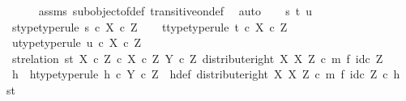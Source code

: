 \begin{isabellebody}
\ \ \ \ \isamarkupfalse%
\ assms\ subobject{\isacharunderscore}{\kern0pt}of{\isacharunderscore}{\kern0pt}def{}\ transitive{\isacharunderscore}{\kern0pt}on{\isacharunderscore}{\kern0pt}def\ \isamarkupfalse%
\ auto\isanewline
\isanewline
\ \ \isamarkupfalse%
\ s\ t\ u\isanewline
\ \ \isamarkupfalse%
\ s{\isacharunderscore}{\kern0pt}type{\isacharbrackleft}{\kern0pt}type{\isacharunderscore}{\kern0pt}rule{\isacharbrackright}{\kern0pt}{\isacharcolon}{\kern0pt}\ {\isachardoublequoteopen}s\ {\isasymin}\isactrlsub c\ X\ {\isasymtimes}\isactrlsub c\ Z{\isachardoublequoteclose}\isanewline
\ \ \isamarkupfalse%
\ t{\isacharunderscore}{\kern0pt}type{\isacharbrackleft}{\kern0pt}type{\isacharunderscore}{\kern0pt}rule{\isacharbrackright}{\kern0pt}{\isacharcolon}{\kern0pt}\ {\isachardoublequoteopen}t\ {\isasymin}\isactrlsub c\ X\ {\isasymtimes}\isactrlsub c\ Z{\isachardoublequoteclose}\isanewline
\ \ \isamarkupfalse%
\ u{\isacharunderscore}{\kern0pt}type{\isacharbrackleft}{\kern0pt}type{\isacharunderscore}{\kern0pt}rule{\isacharbrackright}{\kern0pt}{\isacharcolon}{\kern0pt}\ {\isachardoublequoteopen}u\ {\isasymin}\isactrlsub c\ X\ {\isasymtimes}\isactrlsub c\ Z{\isachardoublequoteclose}\isanewline
\isanewline
\ \ \isamarkupfalse%
\ st{\isacharunderscore}{\kern0pt}relation{\isacharcolon}{\kern0pt}\ {\isachardoublequoteopen}{\isasymlangle}s{\isacharcomma}{\kern0pt}t{\isasymrangle}\ {\isasymin}\isactrlbsub {\isacharparenleft}{\kern0pt}X\ {\isasymtimes}\isactrlsub c\ Z{\isacharparenright}{\kern0pt}\ {\isasymtimes}\isactrlsub c\ X\ {\isasymtimes}\isactrlsub c\ Z\isactrlesub \ {\isacharparenleft}{\kern0pt}Y\ {\isasymtimes}\isactrlsub c\ Z{\isacharcomma}{\kern0pt}\ distribute{\isacharunderscore}{\kern0pt}right\ X\ X\ Z\ {\isasymcirc}\isactrlsub c\ m\ {\isasymtimes}\isactrlsub f\ id\isactrlsub c\ Z{\isacharparenright}{\kern0pt}{\isachardoublequoteclose}\isanewline
\ \ \isamarkupfalse%
\ \isamarkupfalse%
\ h\ \ h{\isacharunderscore}{\kern0pt}type{\isacharbrackleft}{\kern0pt}type{\isacharunderscore}{\kern0pt}rule{\isacharbrackright}{\kern0pt}{\isacharcolon}{\kern0pt}\ {\isachardoublequoteopen}h\ {\isasymin}\isactrlsub c\ Y\ {\isasymtimes}\isactrlsub c\ Z{\isachardoublequoteclose}\ \ h{\isacharunderscore}{\kern0pt}def{\isacharcolon}{\kern0pt}\ {\isachardoublequoteopen}{\isacharparenleft}{\kern0pt}distribute{\isacharunderscore}{\kern0pt}right\ X\ X\ Z\ {\isasymcirc}\isactrlsub c\ m\ {\isasymtimes}\isactrlsub f\ id\isactrlsub c\ Z{\isacharparenright}{\kern0pt}\ {\isasymcirc}\isactrlsub c\ h\ {\isacharequal}{\kern0pt}\ {\isasymlangle}s{\isacharcomma}{\kern0pt}t{\isasymrangle}{\isachardoublequoteclose}\isanewline

\end{isabellebody}
